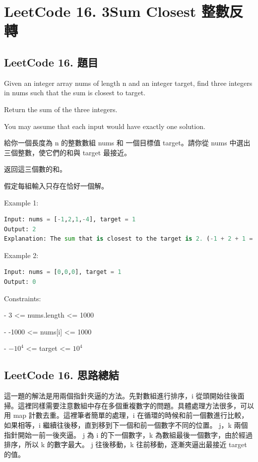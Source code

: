 \documentclass[10pt,UTF8]{ctexart}
\begin{document}
\newpage

\section{LeetCode 16. 3Sum Closest 整數反轉}

\subsection{LeetCode 16. 題目}

Given an integer array nums of length n and an integer target, find three integers in nums such that the sum is closest to target.

Return the sum of the three integers.

You may assume that each input would have exactly one solution.

給你一個長度為 n 的整數數組 nums 和 一個目標值 target。請你從 nums 中選出三個整數，使它們的和與 target 最接近。

返回這三個數的和。

假定每組輸入只存在恰好一個解。

Example 1:
\begin{lstlisting}[language={python}]
Input: nums = [-1,2,1,-4], target = 1
Output: 2
Explanation: The sum that is closest to the target is 2. (-1 + 2 + 1 = 2).
\end{lstlisting}

Example 2:
\begin{lstlisting}[language={python}]
Input: nums = [0,0,0], target = 1
Output: 0
\end{lstlisting}

Constraints:

- 3 <= nums.length <= 1000

- -1000 <= nums[i] <= 1000

- $-10^4$ <= target <= $10^4$

\subsection{LeetCode 16. 思路總結}

這一題的解法是用兩個指針夾逼的方法。先對數組進行排序，i 從頭開始往後面掃。這裡同樣需要注意數組中存在多個重複數字的問題。具體處理方法很多，可以用 map 計數去重。這裡筆者簡單的處理，i 在循環的時候和前一個數進行比較，如果相等，i 繼續往後移，直到移到下一個和前一個數字不同的位置。 j，k 兩個指針開始一前一後夾逼。 j 為 i 的下一個數字，k 為數組最後一個數字，由於經過排序，所以 k 的數字最大。 j 往後移動，k 往前移動，逐漸夾逼出最接近 target 的值。
\end{document}
